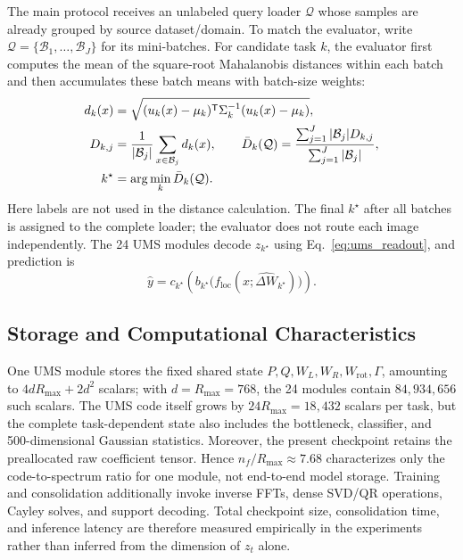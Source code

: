The main protocol receives an unlabeled query loader $\mathcal{Q}$ whose
samples are already grouped by source dataset/domain.  To match the evaluator,
write $\mathcal{Q}=\{\mathcal{B}_1,\ldots,\mathcal{B}_J\}$ for its mini-batches.
For candidate task $k$, the evaluator first computes the mean of the square-root
Mahalanobis distances within each batch and then accumulates these batch means
with batch-size weights:
\begin{align}
 d_k(x)&=\sqrt{(u_k(x)-\mu_k)^{\mathsf T}\Sigma_k^{-1}
 (u_k(x)-\mu_k)},\notag\\
 D_{k,j}&=\frac{1}{|\mathcal{B}_j|}\sum_{x\in\mathcal{B}_j}d_k(x),\qquad
 \bar D_k(\mathcal{Q})=
 \frac{\sum_{j=1}^{J}|\mathcal{B}_j|D_{k,j}}
      {\sum_{j=1}^{J}|\mathcal{B}_j|},\notag\\
 k^\star&=\arg\min_k\bar D_k(\mathcal{Q}).
 \label{eq:dataset_router}
\end{align}
Here labels are not used in the distance calculation.  The final $k^\star$
after all batches is assigned to the complete loader; the evaluator does not
route each image independently.  The 24 UMS modules decode $z_{k^\star}$ using
Eq.~\eqref{eq:ums_readout}, and prediction is
\begin{equation}
 \widehat y=c_{k^\star}\!\left(
 b_{k^\star}\bigl(f_{\mathrm{loc}}(x;\widehat{\Delta W}_{k^\star})\bigr)
 \right).
 \label{eq:prediction}
\end{equation}

\subsection{Storage and Computational Characteristics}
\label{sec:storage}

One UMS module stores the fixed shared state
$P,Q,W_L,W_R,W_{\mathrm{rot}},\Gamma$, amounting to
$4dR_{\max}+2d^2$ scalars; with $d=R_{\max}=768$, the 24 modules contain
$84{,}934{,}656$ such scalars.  The UMS code itself grows by
$24R_{\max}=18{,}432$ scalars per task, but the complete task-dependent state
also includes the bottleneck, classifier, and 500-dimensional Gaussian
statistics.  Moreover, the present checkpoint retains the preallocated raw
coefficient tensor.  Hence $n_f/R_{\max}\approx7.68$ characterizes only the
code-to-spectrum ratio for one module, not end-to-end model storage.  Training
and consolidation additionally invoke inverse FFTs, dense SVD/QR operations,
Cayley solves, and support decoding.  Total checkpoint size, consolidation
time, and inference latency are therefore measured empirically in the
experiments rather than inferred from the dimension of $z_t$ alone.
